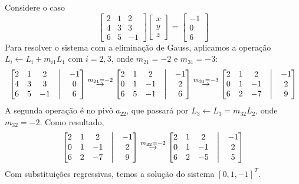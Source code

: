 \documentclass[../numerical_methods.tex]{subfiles}
\begin{document}
\begin{example}
	Considere o caso
	\[
		\begin{bmatrix}
			2 & 1 & 2  \\
			4 & 3 & 3  \\
			6 & 5 & -1
		\end{bmatrix}\begin{bmatrix}
			x \\
			y \\
			z
		\end{bmatrix} = \begin{bmatrix}
			-1 \\
			0  \\
			6
		\end{bmatrix}
	\]
	Para resolver o sistema com a eliminação de Gauss, aplicamos a operação \(L_{i}\leftarrow L_{i}+m_{i1}L_{1}\) com \(i=2, 3\), onde \(m_{21}=-2\) e \(m_{31} = -3\):
	\[
		\begin{bmatrix}
			2 & 1 & 2  & \bigm| & -1 \\
			4 & 3 & 3  & \bigm| & 0  \\
			6 & 5 & -1 & \bigm| & 6
		\end{bmatrix}\stackrel{m_{21}=-2}\rightarrow \begin{bmatrix}
			2 & 1 & 2  & \bigm| & -1 \\
			0 & 1 & -1 & \bigm| & 2  \\
			6 & 5 & -1 & \bigm| & 6
		\end{bmatrix}\stackrel{m_{31}=-3}\rightarrow \begin{bmatrix}
			2 & 1 & 2  & \bigm| & -1 \\
			0 & 1 & -1 & \bigm| & 2  \\
			6 & 2 & -7 & \bigm| & 9
		\end{bmatrix}
	\]
	A segunda operação é no pivô \(a_{22}\), que passará por \(L_{3}\leftarrow L_{3} = m_{32}L_{2}\), onde \(m_{32} = -2\). Como resultado,
	\[
		\begin{bmatrix}
			2 & 1 & 2  & \bigm| & -1 \\
			0 & 1 & -1 & \bigm| & 2  \\
			6 & 2 & -7 & \bigm| & 9
		\end{bmatrix}\stackrel{m_{32}=-2}\rightarrow \begin{bmatrix}
			2 & 1 & 2  & \bigm| & -1 \\
			0 & 1 & -1 & \bigm| & 2  \\
			6 & 2 & -5 & \bigm| & 5
		\end{bmatrix}
	\]
	Com substituições regressivas, temos a solução do sistema \([0, 1, -1]^{T}.\)
\end{example}
\end{document}
